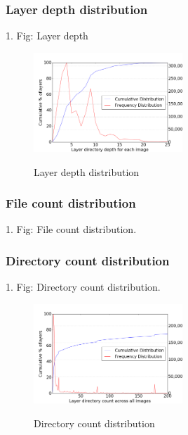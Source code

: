 \subsubsection{Layer depth distribution}

1. Fig: Layer depth

\begin{figure}
	\centering
	\includegraphics[width=0.5\textwidth]{graphs/Layer_directory_depth_for_each_image.png}\\
	\caption{Layer depth distribution}\label{fig_image_size_compression}
\end{figure}


\subsubsection{File count distribution}

1. Fig: File count distribution.

\subsubsection{Directory count distribution}

1. Fig: Directory count distribution.

\begin{figure}
	\centering
	\includegraphics[width=0.5\textwidth]{graphs/Layer_directory_count_across_all_images.png}\\
	\caption{Directory count distribution}\label{fig_image_size_compression}
\end{figure}

